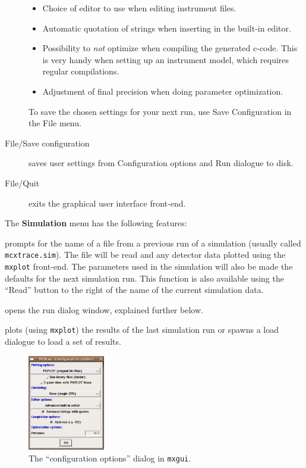 \begin{description}
\begin{itemize}
  \item Choice of editor to use when editing instrument files.
  \item Automatic quotation of strings when inserting in the built-in
    editor.
  \item Possibility to \emph{not} optimize when compiling the
    generated c-code. This is very handy when setting up an instrument model, which requires regular compilations.
  \item Adjustment of final precision when doing parameter optimization.
\end{itemize}
To save the chosen settings for your next \MCX run, use Save
Configuration in the File menu.
\item[File/Save configuration] saves user settings from Configuration
  options and Run dialogue to disk.
\item[File/Quit] exits the graphical user interface front-end.
\end{description}

\noindent The {\bfseries Simulation} menu has the following features:
\begin{description} 
\item[Simulation/Read old simulation] prompts for the name of a file
  from a previous run of a \MCX  simulation (usually called
  \verb+mcxtrace.sim+). The file will be read and any detector data
  plotted using the \verb+mxplot+ front-end. The parameters used in the
  simulation will also be made the defaults for the next simulation
  run. This function is also available using the ``Read'' button to the
  right of the name of the current simulation data.
\item[Simulation/Run simulation] opens the run dialog window, explained
  further below.
\item[Simulation/Plot results] plots (using \verb+mxplot+) the results of the
  last simulation run or spawns a load dialogue to load a set of results.
\end{description}


\begin{figure}[htb!]
  \begin{center}
    \includegraphics[width=0.3\textwidth]{figures/choose_backend.eps}
  \end{center}
\caption{The ``configuration options'' dialog in \texttt{mxgui}.} 
\label{fig:mxgui-choose}
\end{figure}


